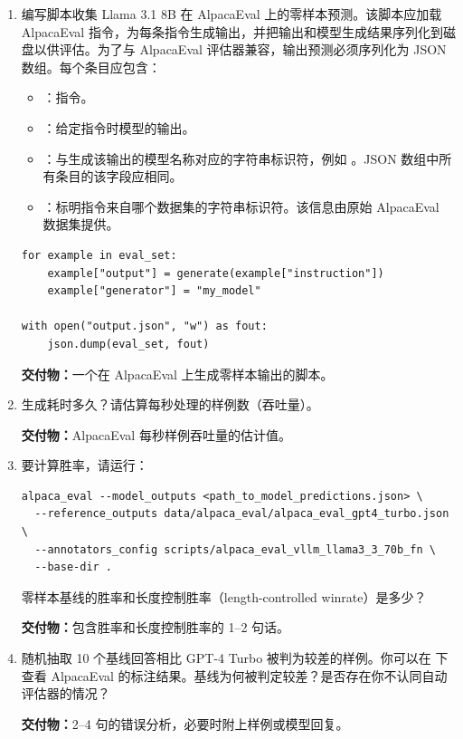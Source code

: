 \begin{enumerate}[label=(\alph*)]
  \item 编写脚本收集 Llama 3.1 8B 在 AlpacaEval 上的零样本预测。该脚本应加载 AlpacaEval 指令，为每条指令生成输出，并把输出和模型生成结果序列化到磁盘以供评估。为了与 AlpacaEval 评估器兼容，输出预测必须序列化为 JSON 数组。每个条目应包含：
  \begin{itemize}
    \item {}：指令。
    \item {}：给定指令时模型的输出。
    \item {}：与生成该输出的模型名称对应的字符串标识符，例如 。JSON 数组中所有条目的该字段应相同。
    \item {}：标明指令来自哪个数据集的字符串标识符。该信息由原始 AlpacaEval 数据集提供。
  \end{itemize}

\begin{lstlisting}
for example in eval_set:
    example["output"] = generate(example["instruction"])
    example["generator"] = "my_model"

with open("output.json", "w") as fout:
    json.dump(eval_set, fout)
\end{lstlisting}

  \textbf{交付物：}一个在 AlpacaEval 上生成零样本输出的脚本。
  \item 生成耗时多久？请估算每秒处理的样例数（吞吐量）。

  \textbf{交付物：}AlpacaEval 每秒样例吞吐量的估计值。
  \item 要计算胜率，请运行：

\begin{lstlisting}
alpaca_eval --model_outputs <path_to_model_predictions.json> \
  --reference_outputs data/alpaca_eval/alpaca_eval_gpt4_turbo.json \
  --annotators_config scripts/alpaca_eval_vllm_llama3_3_70b_fn \
  --base-dir .
\end{lstlisting}

  零样本基线的胜率和长度控制胜率（length-controlled winrate）是多少？

  \textbf{交付物：}包含胜率和长度控制胜率的 1--2 句话。
  \item 随机抽取 10 个基线回答相比 GPT-4 Turbo 被判为较差的样例。你可以在  下查看 AlpacaEval 的标注结果。基线为何被判定较差？是否存在你不认同自动评估器的情况？

  \textbf{交付物：}2--4 句的错误分析，必要时附上样例或模型回复。
\end{enumerate}

